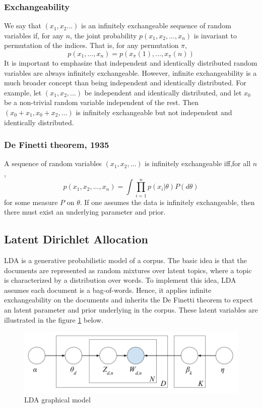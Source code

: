 \documentclass[conference,compsoc]{IEEEtran}
\begin{document}
\subsubsection{Exchangeability}

We say that $(x_1,x_2...)$ is an infinitely exchangeable sequence of random variables if, for any $n$, the joint probability $p(x_1,x_2,...,x_n)$ is invariant to permutation of the indices. That is, for any permutation $\pi$,
\[p(x_1,...,x_n) = p(x_\pi(1),...,x_\pi(n))\]
It is important to emphasize that independent and identically distributed random variables are always infinitely exchangeable. However, infinite exchangeability is a much broader concept than being independent and identically distributed. For example, let $(x_1,x_2,\dots)$ be independent and identically distributed, and let $x_0$ be a non-trivial random variable independent of the rest. Then $(x_0+x_1,x_0+x_2,\dots)$ is infinitely exchangeable but not independent and identically distributed.

\subsubsection{De Finetti theorem, 1935}
A sequence of random variables $(x_1,x_2,...)$ is infinitely exchangeable iff,for all $n$,
\[p(x_1,x_2,...,x_n)=\int\prod_{i=1}^{n}p(x_i|\theta)P(d\theta)\]
for some measure $P$ on $\theta$.
If one assumes the data is infinitely exchangeable, then there must exist an underlying parameter and prior.

\subsection{Latent Dirichlet Allocation}
LDA is a generative probabilistic model of a corpus. The basic idea is that the documents are represented as random mixtures over latent topics, where a topic is characterized by a distribution over words. To implement this idea, LDA assumes each document is a bag-of-words. Hence, it applies infinite exchangeability on the documents and inherits the De Finetti theorem to expect an latent parameter and prior underlying in the corpus. These latent variables are illustrated in the figure \ref{fig:lda_model} below.


\begin{figure}[h]
	\centering
	\includegraphics[scale=0.27]{lda_model}
	\caption{LDA graphical model}
	\label{fig:lda_model}
\end{figure}
\end{document}
